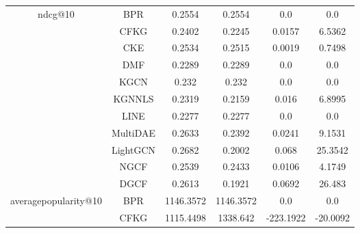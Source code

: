 \begin{table}[H]
{\begin{tabular}{|c|c|c|c|c|c|}
            \multirow{11}{*}{ndcg@10}   & BPR      & 0.2554                  & 0.2554                    & 0.0               & 0.0               \\ \cline{2-6}
                                         & CFKG     & 0.2402                  & 0.2245                    & 0.0157            & 6.5362            \\ \cline{2-6}
                                         & CKE      & 0.2534                  & 0.2515                    & 0.0019            & 0.7498            \\ \cline{2-6}
                                         & DMF      & 0.2289                  & 0.2289                    & 0.0               & 0.0               \\ \cline{2-6}
                                         & KGCN     & 0.232                   & 0.232                     & 0.0               & 0.0               \\ \cline{2-6}
                                         & KGNNLS   & 0.2319                  & 0.2159                    & 0.016             & 6.8995            \\ \cline{2-6}
                                         & LINE     & 0.2277                  & 0.2277                    & 0.0               & 0.0               \\ \cline{2-6}
                                         & MultiDAE & 0.2633                  & 0.2392                    & 0.0241            & 9.1531            \\ \cline{2-6}
                                         & LightGCN & 0.2682                  & 0.2002                    & 0.068             & 25.3542           \\ \cline{2-6}
                                         & NGCF     & 0.2539                  & 0.2433                    & 0.0106            & 4.1749            \\ \cline{2-6}
                                         & DGCF     & 0.2613                  & 0.1921                    & 0.0692            & 26.483            \\ \hline
            \multirow{11}{*}{averagepopularity@10} & BPR      & 1146.3572              & 1146.3572                 & 0.0               & 0.0               \\ \cline{2-6}
                                                     & CFKG     & 1115.4498              & 1338.642                  & -223.1922         & -20.0092          \\ \cline{2-6}

\end{tabular}}
\end{table}
